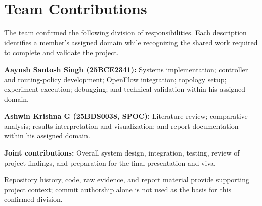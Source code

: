 \section{Team Contributions}
The team confirmed the following division of responsibilities. Each description identifies a member's assigned domain while recognizing the shared work required to complete and validate the project.

\noindent\textbf{Aayush Santosh Singh (25BCE2341):} Systems implementation; controller and routing-policy development; OpenFlow integration; topology setup; experiment execution; debugging; and technical validation within his assigned domain.

\noindent\textbf{Ashwin Krishna G (25BDS0038, SPOC):} Literature review; comparative analysis; results interpretation and visualization; and report documentation within his assigned domain.

\noindent\textbf{Joint contributions:} Overall system design, integration, testing, review of project findings, and preparation for the final presentation and viva.

Repository history, code, raw evidence, and report material provide supporting project context; commit authorship alone is not used as the basis for this confirmed division.
